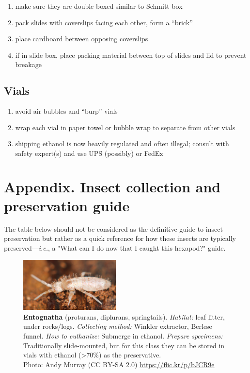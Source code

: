 \documentclass[letterpaper, 11pt]{article}
\begin{document}
\begin{enumerate}
\item make sure they are double boxed similar to Schmitt box
\item pack slides with coverslips facing each other, form a “brick”
\item place cardboard between opposing coverslips
\item if in slide box, place packing material between top of slides and lid to prevent breakage
\end{enumerate}

\subsection*{Vials}
\begin{enumerate}
\item avoid air bubbles and “burp” vials
\item wrap each vial in paper towel or bubble wrap to separate from other vials
\item shipping ethanol is now heavily regulated and often illegal; consult with safety expert(s) and use UPS (possibly) or FedEx
\end{enumerate}

\clearpage
\section*{Appendix. Insect collection and preservation guide}
The table below should not be considered as the definitive guide to insect preservation but rather as a quick reference for how these insects are typically preserved---\textit{i.e.}, a "What can I do now that I caught this hexapod?" guide.

\begin{figure}
  \caption{\textbf{Entognatha} (proturans, diplurans, springtails). \textit{Habitat:} leaf litter, under rocks/logs. \textit{Collecting method:} Winkler extractor, Berlese funnel. \textit{How to euthanize:} Submerge in ethanol. \textit{Prepare specimens:} Traditionally slide-mounted, but for this class they can be stored in vials with ethanol (\textgreater70\%) as the preservative.\\ Photo: Andy Murray (CC BY-SA 2.0) \url{https://flic.kr/p/bJCR9e}}
  \includegraphics[width=0.45\textwidth]{Collembola}
\end{figure}
\end{document}
